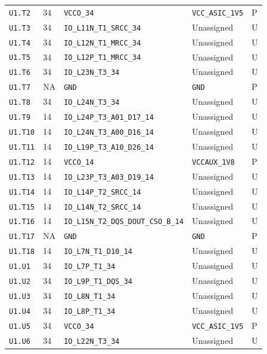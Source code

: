 \documentclass[11pt,a4paper]{article}
\begin{document}
\begin{longtable}{@{}P{20mm}P{10mm}P{70mm}P{51mm}P{11mm}@{}}
\nolinkurl{U1.T2} & 34 & \nolinkurl{VCCO_34} & \nolinkurl{VCC_ASIC_1V5} & P \\
\nolinkurl{U1.T3} & 34 & \nolinkurl{IO_L11N_T1_SRCC_34} & Unassigned & U \\
\nolinkurl{U1.T4} & 34 & \nolinkurl{IO_L12N_T1_MRCC_34} & Unassigned & U \\
\nolinkurl{U1.T5} & 34 & \nolinkurl{IO_L12P_T1_MRCC_34} & Unassigned & U \\
\nolinkurl{U1.T6} & 34 & \nolinkurl{IO_L23N_T3_34} & Unassigned & U \\
\nolinkurl{U1.T7} & NA & \nolinkurl{GND} & \nolinkurl{GND} & P \\
\nolinkurl{U1.T8} & 34 & \nolinkurl{IO_L24N_T3_34} & Unassigned & U \\
\nolinkurl{U1.T9} & 14 & \nolinkurl{IO_L24P_T3_A01_D17_14} & Unassigned & U \\
\nolinkurl{U1.T10} & 14 & \nolinkurl{IO_L24N_T3_A00_D16_14} & Unassigned & U \\
\nolinkurl{U1.T11} & 14 & \nolinkurl{IO_L19P_T3_A10_D26_14} & Unassigned & U \\
\nolinkurl{U1.T12} & 14 & \nolinkurl{VCCO_14} & \nolinkurl{VCCAUX_1V8} & P \\
\nolinkurl{U1.T13} & 14 & \nolinkurl{IO_L23P_T3_A03_D19_14} & Unassigned & U \\
\nolinkurl{U1.T14} & 14 & \nolinkurl{IO_L14P_T2_SRCC_14} & Unassigned & U \\
\nolinkurl{U1.T15} & 14 & \nolinkurl{IO_L14N_T2_SRCC_14} & Unassigned & U \\
\nolinkurl{U1.T16} & 14 & \nolinkurl{IO_L15N_T2_DQS_DOUT_CSO_B_14} & Unassigned & U \\
\nolinkurl{U1.T17} & NA & \nolinkurl{GND} & \nolinkurl{GND} & P \\
\nolinkurl{U1.T18} & 14 & \nolinkurl{IO_L7N_T1_D10_14} & Unassigned & U \\
\nolinkurl{U1.U1} & 34 & \nolinkurl{IO_L7P_T1_34} & Unassigned & U \\
\nolinkurl{U1.U2} & 34 & \nolinkurl{IO_L9P_T1_DQS_34} & Unassigned & U \\
\nolinkurl{U1.U3} & 34 & \nolinkurl{IO_L8N_T1_34} & Unassigned & U \\
\nolinkurl{U1.U4} & 34 & \nolinkurl{IO_L8P_T1_34} & Unassigned & U \\
\nolinkurl{U1.U5} & 34 & \nolinkurl{VCCO_34} & \nolinkurl{VCC_ASIC_1V5} & P \\
\nolinkurl{U1.U6} & 34 & \nolinkurl{IO_L22N_T3_34} & Unassigned & U \\

\end{longtable}
\end{document}
